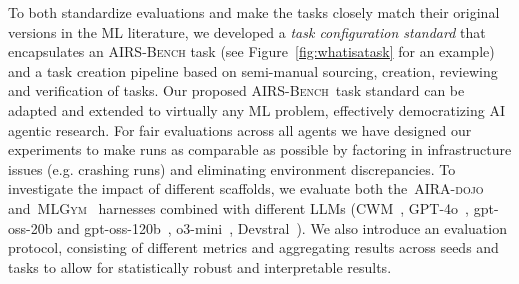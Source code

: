 \documentclass{fairmeta}
\newcommand{\airsbench}{\textsc{AIRS-Bench}}
\newcommand{\airadojo}{\textsc{AIRA-dojo}}
\newcommand{\mlgym}{\textsc{MLGym}}
\begin{document}


To both standardize evaluations and make the tasks closely match their original versions in the ML literature, we developed a \textit{task configuration standard} that encapsulates an \airsbench{} task (see Figure~\ref{fig:whatisatask} for an example) and a task creation pipeline based on semi-manual sourcing, creation, reviewing and verification of tasks. Our proposed \airsbench~task standard can be adapted and extended to virtually any ML problem, effectively democratizing AI agentic research.
For fair evaluations across all agents we have designed our experiments to make runs as comparable as possible by factoring in infrastructure issues (e.g. crashing runs) and eliminating environment discrepancies. To investigate the impact of different scaffolds, we evaluate both the~\airadojo ~\citep{toledo2025airesearchagentsmachine} and~\mlgym ~\citep{nathani2025mlgym} harnesses combined with different LLMs (CWM~\citep{carbonneaux2025cwm}, GPT-4o~\citep{openai2024gpt4osystemcard}, gpt-oss-20b and gpt-oss-120b~\citep{openai2024gptoss}, o3-mini~\citep{openai2024o3o4mini}, Devstral~\citep{rastogi2025devstral}).
We also introduce an evaluation protocol, consisting of different metrics and aggregating results across seeds and tasks to allow for statistically robust and interpretable results.

\end{document}

